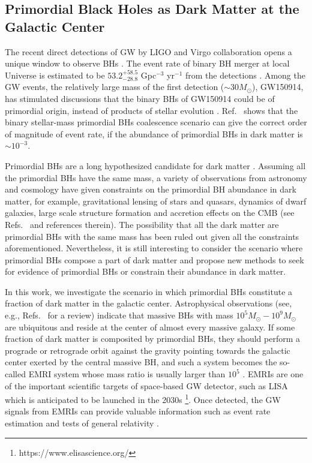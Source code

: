 \subsection{Primordial Black Holes as Dark Matter at the Galactic Center}

The recent direct detections of \ac{GW} by LIGO and Virgo collaboration opens a unique window to observe \acp{BH}
\cite{Abbott:2016blz,Abbott:2016nmj,O1,Abbott:2017vtc,Abbott:2017oio,TheLIGOScientific:2017qsa,Abbott:2017gyy,GWTC1}.
The event rate of binary \ac{BH} merger at local Universe is estimated to be $53.2^{+58.5}_{-28.8}$ Gpc$^{-3}$ yr$^{-1}$ from the detections \cite{GWTC1-rate}. 
Among the \ac{GW} events, the relatively large mass of the first detection ($\sim 30 M_\odot$), GW150914, has stimulated discussions that the binary \acp{BH} of GW150914 could be of primordial origin, instead of products of stellar evolution \cite{Bird:2016dcv,Clesse:2016vqa,Sasaki:2016jop}.
Ref.~\cite{Sasaki:2016jop} shows that the binary stellar-mass primordial \acp{BH} coalescence scenario can give the correct order of magnitude of event rate, if the abundance of primordial \acp{BH} in dark matter is $\sim10^{-3}$.

Primordial \acp{BH} are a long hypothesized candidate for dark matter \cite{Hawking:1971ei,Carr:1974nx,PBH1993-Silk,PBH1996}. 
Assuming all the primordial \acp{BH} have the same mass, a variety of observations from astronomy and cosmology have given constraints on the primordial \ac{BH} abundance in dark matter, for example, gravitational lensing of stars and quasars, dynamics of dwarf galaxies, large scale structure formation and accretion effects on the \ac{CMB} (see Refs.~\cite{Carr:2016drx,Sasaki:2018dmp} and references therein). 
The possibility that all the dark matter are primordial \acp{BH} with the same mass has been ruled out given all the constraints aforementioned.
Nevertheless, it is still interesting to consider the scenario where primordial \acp{BH} compose a part of dark matter and propose new methods to seek for evidence of primordial \acp{BH} or constrain their abundance in dark matter.

In this work, we investigate the scenario in which primordial \acp{BH} constitute a fraction of dark matter in the galactic center.
Astrophysical observations (see, e.g., Refs.~\cite{SMBH-Review-2,SMBH-Review-1} for a review) indicate that massive \acp{BH} with mass $10^5 M_\odot- 10^{9} M_\odot$ are ubiquitous and reside at the center of almost every massive galaxy. 
If some fraction of dark matter is composited by  primordial \acp{BH}, they should perform a prograde or retrograde orbit against the gravity pointing towards the galactic center exerted by the central massive \ac{BH}, and such a system becomes the so-called \ac{EMRI} system whose mass ratio is usually larger than $10^5$ \cite{Babak:2017tow}.
\acp{EMRI} are one of the important scientific targets of space-based \ac{GW} detector, such as \ac{LISA} which is anticipated to be launched in the 2030s \footnote{https://www.elisascience.org/}.
Once detected, the \ac{GW} signals from \acp{EMRI} can provide valuable information such as event rate estimation \cite{Babak:2017tow,AmaroSeoane:2010bq} and tests of general relativity \cite{Barack:2006pq,Gair:2012nm}.

